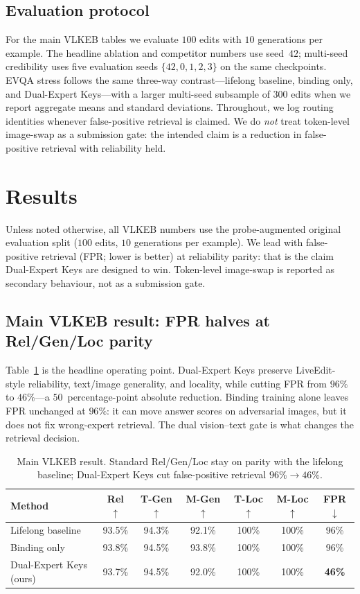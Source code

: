 \documentclass[letterpaper]{article} %
\begin{document}
\subsection{Evaluation protocol}
For the main VLKEB tables we evaluate $100$ edits with $10$ generations per example.
The headline ablation and competitor numbers use seed~$42$; multi-seed credibility uses five evaluation seeds $\{42,0,1,2,3\}$ on the same checkpoints.
EVQA stress follows the same three-way contrast---lifelong baseline, binding only, and Dual-Expert Keys---with a larger multi-seed subsample of $300$ edits when we report aggregate means and standard deviations.
Throughout, we log routing identities whenever false-positive retrieval is claimed.
We do \emph{not} treat token-level image-swap as a submission gate: the intended claim is a reduction in false-positive retrieval with reliability held.

\section{Results}
\label{sec:results}

Unless noted otherwise, all VLKEB numbers use the probe-augmented original evaluation split ($100$ edits, $10$ generations per example).
We lead with false-positive retrieval (FPR; lower is better) at reliability parity: that is the claim Dual-Expert Keys are designed to win.
Token-level image-swap is reported as secondary behaviour, not as a submission gate.

\subsection{Main VLKEB result: FPR halves at Rel/Gen/Loc parity}
Table~\ref{tab:standard-vlkeb} is the headline operating point.
Dual-Expert Keys preserve LiveEdit-style reliability, text/image generality, and locality, while cutting FPR from $96\%$ to $46\%$---a $50$~percentage-point absolute reduction.
Binding training alone leaves FPR unchanged at $96\%$: it can move answer scores on adversarial images, but it does not fix wrong-expert retrieval.
The dual vision--text gate is what changes the retrieval decision.

\begin{table}[!ht]
\centering
\small
\setlength{\tabcolsep}{6pt}
\begin{tabular}{lcccccc}
\toprule
Method & Rel$\uparrow$ & T-Gen$\uparrow$ & M-Gen$\uparrow$ & T-Loc$\uparrow$ & M-Loc$\uparrow$ & FPR$\downarrow$ \\
\midrule
Lifelong baseline & 93.5\% & 94.3\% & 92.1\% & 100\% & 100\% & 96\% \\
Binding only & 93.8\% & 94.5\% & 93.8\% & 100\% & 100\% & 96\% \\
Dual-Expert Keys (ours) & 93.7\% & 94.5\% & 92.0\% & 100\% & 100\% & \textbf{46\%} \\
\bottomrule
\end{tabular}
\caption{Main VLKEB result.
Standard Rel/Gen/Loc stay on parity with the lifelong baseline; Dual-Expert Keys cut false-positive retrieval $96\%\!\rightarrow\!46\%$.}
\label{tab:standard-vlkeb}
\end{table}
\end{document}
